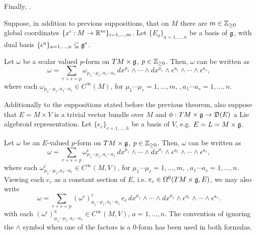 \begin{theorem}
Finally, .
\end{theorem}

\linea

Suppose, in addition to previous suppositions, that on $M$ there are $m \in \mathbb{Z}_{\geq 0}$ global coordinates $\{x^i: M \to \mathbb{R}^m\}_{i = 1, \dots, m}$. Let $\{E_a\}_{a = 1, \dots, n}$ be a basis of $\mathfrak{g}$, with dual basis $\{\epsilon^a\}_{a = 1, \dots, n} \subset \alg g^*$.

\begin{theorem}\label{TheoremDecompOfScalarValuedFormsTLA}
Let $\omega$ be a scalar valued $p$-form on $TM \times \mathfrak{g}$, $p \in \mathbb{Z}_{\geq 0}$. Then, $\omega$ can be written as
\begin{equation}
    \omega = \sum_{r + s = p} \omega_{\mu_1 \cdots \mu_r, a_1 \cdots a_s}\, dx^{\mu_1} \wedge \cdots \wedge dx^{\mu_r} \wedge \epsilon^{a_1} \wedge \cdots \wedge \epsilon^{a_s},
\end{equation}
where each $\omega_{\mu_1 \cdots \mu_r, a_1 \cdots a_s} \in C^\infty(M)$, for $\mu_1 \cdots \mu_r = 1, \dots, m$, $, a_1 \cdots a_s = 1, \dots, n$.
\end{theorem}

\lin

Additionally to the suppositions stated before the previous theorem, also suppose that $E = M \times V$ is a trivial vector bundle over $M$ and $\phi: TM \times \alg g \to \alg D(E)$ a Lie algebroid representation. Let $\{e_c\}_{c = 1, \dots, h}$ be a basis of $V$, e.g. $E = L = M \times \mathfrak{g}$.

\begin{theorem}\label{TheoremDecompOfVectorValuedFormsTLA}
Let $\omega$ be an $E$-valued $p$-form on $TM \times \mathfrak{g}$, $p \in \mathbb{Z}_{\geq 0}$. Then, $\omega$ can be written as
\begin{equation}
    \omega = \sum_{r + s = p} \omega^\epsilon_{\mu_1 \cdots \mu_r, a_1 \cdots a_s}\, dx^{\mu_1} \wedge \cdots \wedge dx^{\mu_r} \wedge \epsilon^{a_1} \wedge \cdots \wedge \epsilon^{a_s},
\end{equation}
where each $\omega^\epsilon_{\mu_1 \cdots \mu_r, a_1 \cdots a_s} \in C^\infty(M, V)$, for $\mu_1 \cdots \mu_r = 1, \dots, m$, $, a_1 \cdots a_s = 1, \dots, n$. Viewing each $e_c$ as a constant section of $E$, i.e. $e_c \in \Omega^0(TM \times \mathfrak{g}, E)$, we may also write
\begin{equation}
    \omega = \sum_{r + s = p} \left(\omega^\epsilon\right)^c_{\mu_1 \cdots \mu_r, a_1 \cdots a_s}\, e_c \, dx^{\mu_1} \wedge \cdots \wedge dx^{\mu_r} \wedge \epsilon^{a_1} \wedge \cdots \wedge \epsilon^{a_s}.
\end{equation} 
with each $\left(\omega^\epsilon\right)^a_{\mu_1 \cdots \mu_r, a_1 \cdots a_s} \in C^\infty(M, V)$, $a = 1, \dots, n$.
The convention of ignoring the $\wedge$ symbol when one of the factors is a $0$-form has been used in both formulas.
\end{theorem}

